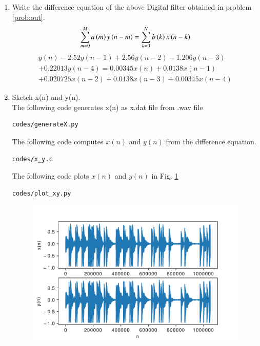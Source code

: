 \documentclass[journal,12pt,twocolumn]{IEEEtran}
\renewcommand\thesection{\arabic{section}}
\begin{document}
\begin{enumerate}[label=\thesection.\arabic*,ref=\thesection.\theenumi]
\item
\label{prob:diffEq}
Write the difference equation of the above Digital filter obtained in problem \ref{prob:out}.
\\
\solution
\begin{equation}
\label{eq:eqn1}
 \sum _{m=0}^{M}a\left(m\right)y\left(n-m\right)=\sum _{k=0}^{N}b\left(k\right)x\left(n-k\right)
\end{equation}
\begin{equation}
\label{eq:eqn2}
\begin{split}
y(n) - 2.52y(n-1) + 2.56y(n-2) - 1.206y(n-3)
\\
+ 0.22013y(n-4) = 0.00345x(n) + 0.0138x(n-1)
\\
+ 0.020725x(n-2) + 0.0138x(n-3) + 0.00345x(n-4)
\end{split}
\end{equation}

\item
\label{prob:plot_x_y}
Sketch x(n) and y(n).
\\
\solution
The following code generates x(n) as x.dat file from .wav file
\begin{lstlisting}
codes/generateX.py
\end{lstlisting}

The following code computes $x(n)$ and $y(n)$ from the difference equation.
\begin{lstlisting}
codes/x_y.c
\end{lstlisting}
The following code plots $x(n)$ and $y(n)$ in Fig. \ref{fig:xy}
\begin{lstlisting}
codes/plot_xy.py
\end{lstlisting}
\begin{figure}[!ht]
\begin{center}
\includegraphics[width=\columnwidth]{./figs/xnyn}
\end{center}
\label{fig:xy}	
\end{figure}
\end{enumerate}
\end{document}
